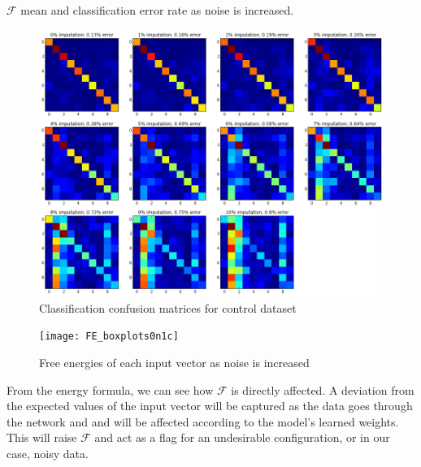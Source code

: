 \documentclass{report}
\begin{document}
\begin{table}
	\begin{center}
	\end{center}
	\caption{$\mathcal{F}$ mean and classification error rate as noise is increased.}
	\label{table:control}
\end{table}

\begin{figure}
\begin{center}
	\includegraphics[width=\textwidth]{confusion_matrices}
	\caption{Classification confusion matrices for control dataset}
	\label{fig:CM}
\end{center}
\end{figure}

\begin{figure}
	\centering
		\texttt{[image: FE\_boxplots0n1c]}
	\caption{Free energies of each input vector as noise is increased}
	\label{fig:nrgs}
\end{figure}


From the energy formula, we can see how $\mathcal{F}$ is directly affected. A deviation from the expected values of the input vector will be captured as the data goes through the network and and will be affected according to the model's learned weights. This will raise $\mathcal{F}$ and act as a flag for an undesirable configuration, or in our case, noisy data.
\end{document}
